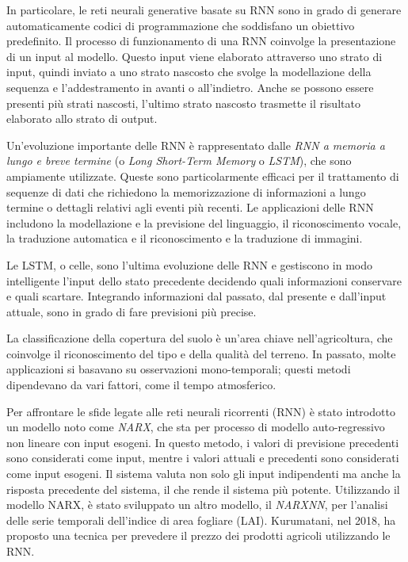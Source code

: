 In particolare, le reti neurali generative basate su RNN sono in grado di generare automaticamente codici di programmazione che soddisfano un obiettivo predefinito. Il processo di funzionamento di una RNN coinvolge la presentazione di un input al modello. Questo input viene elaborato attraverso uno strato di input, quindi inviato a uno strato nascosto che svolge la modellazione della sequenza e l'addestramento in avanti o all'indietro. Anche se possono essere presenti più strati nascosti, l'ultimo strato nascosto trasmette il risultato elaborato allo strato di output.

Un'evoluzione importante delle RNN è rappresentato dalle \textit{RNN a memoria a lungo e breve termine} (o \textit{Long Short-Term Memory} o \textit{LSTM}), che sono ampiamente utilizzate. Queste sono particolarmente efficaci per il trattamento di sequenze di dati che richiedono la memorizzazione di informazioni a lungo termine o dettagli relativi agli eventi più recenti. Le applicazioni delle RNN includono la modellazione e la previsione del linguaggio, il riconoscimento vocale, la traduzione automatica e il riconoscimento e la traduzione di immagini.

Le LSTM, o celle, sono l'ultima evoluzione delle RNN e gestiscono in modo intelligente l'input dello stato precedente decidendo quali informazioni conservare e quali scartare. Integrando informazioni dal passato, dal presente e dall'input attuale, sono in grado di fare previsioni più precise. 

La classificazione della copertura del suolo è un'area chiave nell'agricoltura, che coinvolge il riconoscimento del tipo e della qualità del terreno. In passato, molte applicazioni si basavano su osservazioni mono-temporali; questi metodi dipendevano da vari fattori, come il tempo atmosferico.

Per affrontare le sfide legate alle reti neurali ricorrenti (RNN) è stato introdotto un modello noto come \textit{NARX}, che sta per processo di modello auto-regressivo non lineare con input esogeni. In questo metodo, i valori di previsione precedenti sono considerati come input, mentre i valori attuali e precedenti sono considerati come input esogeni. Il sistema valuta non solo gli input indipendenti ma anche la risposta precedente del sistema, il che rende il sistema più potente. Utilizzando il modello NARX, è stato sviluppato un altro modello, il \textit{NARXNN}, per l'analisi delle serie temporali dell'indice di area fogliare (LAI). Kurumatani, nel 2018, ha proposto una tecnica per prevedere il prezzo dei prodotti agricoli utilizzando le RNN.

